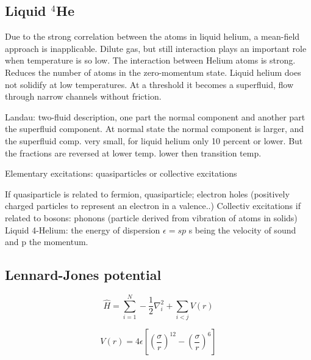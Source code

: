 \subsection{Liquid $^4$He}
Due to the strong correlation between the atoms in liquid helium, a mean-field approach is inapplicable. Dilute gas, but still interaction plays an important role when temperature is so low. 
The interaction between Helium atoms is strong. Reduces the number of atoms in the zero-momentum state. 
Liquid helium does not solidify at low temperatures. At a threshold it becomes a superfluid, flow through narrow channels without friction. 

Landau: two-fluid description, one part the normal component and another part the superfluid component. 
At normal state the normal component is larger, and the superfluid comp. very small, for liquid helium only 10 percent or lower.
But the fractions are reversed at lower temp. lower then transition temp. 

Elementary excitations: quasiparticles or collective excitations

If quasiparticle is related to fermion, quasiparticle; electron holes (positively charged particles to represent an electron in a valence..)
Collectiv excitations if related to bosons: phonons (particle derived from vibration of atoms in solids) 
Liquid 4-Helium: the energy of dispersion $\epsilon = sp$ s being the velocity of sound and p the momentum.

\subsection{Lennard-Jones potential}


\begin{equation} \label{eq:hamilt_box}
\hat{H} = \sum_{i=1}^N - \frac{1}{2} \nabla_i^2  + \sum_{i<j} V(r)
\end{equation}

\begin{equation} \label{eq:lennard-jones}
V(r) = 4\epsilon \left[ \left( \frac{\sigma}{r} \right)^{12} - \left( \frac{\sigma}{r} \right)^6 \right]
\end{equation}
